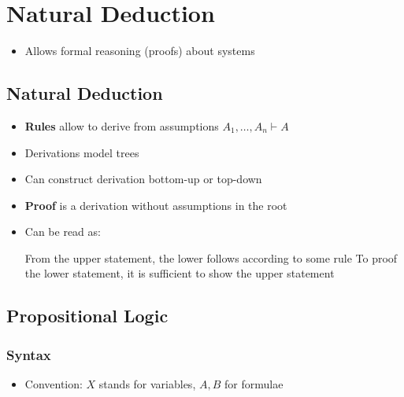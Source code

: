 
\section{Natural Deduction}
\begin{itemize}
    \item Allows formal reasoning (proofs) about systems
\end{itemize}

\subsection{Natural Deduction}
\begin{itemize}
    \item \textbf{Rules} allow to derive from assumptions $A_1, \dots , A_n \vdash A$
    \item Derivations model trees
    \item Can construct derivation bottom-up or top-down
    \item \textbf{Proof} is a derivation without assumptions in the root
    \item Can be read as:
        \begin{itemize}
             From the upper statement, the lower follows according to some rule
             To proof the lower statement, it is sufficient to show the upper statement
        \end{itemize}
\end{itemize}

\subsection{Propositional Logic}
\subsubsection{Syntax}
\begin{itemize}
     For set of variables $\mathcal{V}$, $\mathcal{L}_p$ is the minimal set with:
        \begin{itemize}
            \item $X \in \mathcal{L}_p \text{ if } X \in \mathcal{V}$
            \item $\perp \in \mathcal{L}_p$
            \item $A \wedge B \in \mathcal{L}_p \text{ if } A \in \mathcal{L}_p \text{ and } B \in \mathcal{L}_p$
            \item $A \vee B \in \mathcal{L}_p \text{ if } A \in \mathcal{L}_p \text{ and } B \in \mathcal{L}_p$
            \item $A \to B \in \mathcal{L}_p \text{ if } A \in \mathcal{L}_p \text{ and } {L}_p \text{ and } B \in \mathcal{L}_p$
        \end{itemize}
    \item Convention: $X$ stands for variables, $A, B$ for formulae
\end{itemize}

